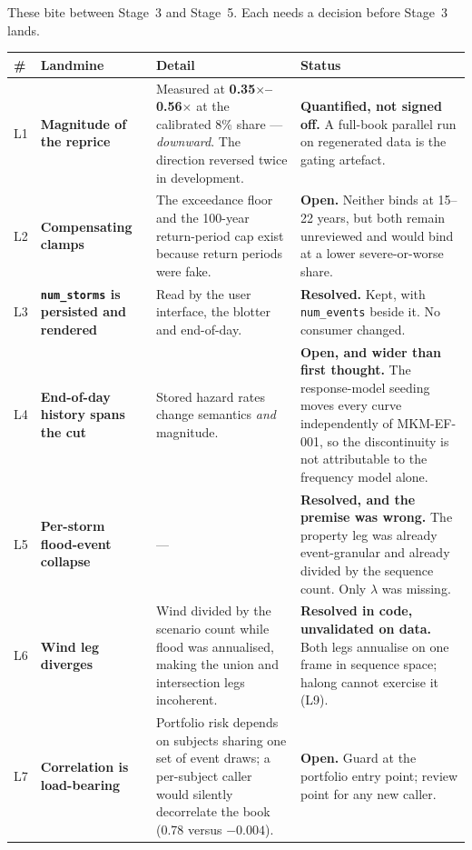 \documentclass[11pt]{article}
\begin{document}
These bite between Stage~3 and Stage~5. Each needs a decision before Stage~3
lands.

\begin{longtable}{@{}p{}p{}p{}p{}@{}}
\toprule
\textbf{\#} & \textbf{Landmine} & \textbf{Detail} & \textbf{Status} \\
\midrule
\endhead
L1 & \textbf{Magnitude of the reprice} & Measured at
\textbf{0.35$\times$--0.56$\times$} at the calibrated 8\% share ---
\emph{downward}. The direction reversed twice in development. & \textbf{Quantified,
not signed off.} A full-book parallel run on regenerated data is the gating
artefact. \\
\addlinespace
L2 & \textbf{Compensating clamps} & The exceedance floor and the 100-year
return-period cap exist because return periods were fake. & \textbf{Open.}
Neither binds at 15--22 years, but both remain unreviewed and would bind at a
lower severe-or-worse share. \\
\addlinespace
L3 & \textbf{\texttt{num\_storms} is persisted and rendered} & Read by the user
interface, the blotter and end-of-day. & \textbf{Resolved.} Kept, with
\texttt{num\_events} beside it. No consumer changed. \\
\addlinespace
L4 & \textbf{End-of-day history spans the cut} & Stored hazard rates change
semantics \emph{and} magnitude. & \textbf{Open, and wider than first thought.}
The response-model seeding moves every curve independently of MKM-EF-001, so the
discontinuity is not attributable to the frequency model alone. \\
\addlinespace
L5 & \textbf{Per-storm flood-event collapse} & --- & \textbf{Resolved, and the
premise was wrong.} The property leg was already event-granular and already
divided by the sequence count. Only $\lambda$ was missing. \\
\addlinespace
L6 & \textbf{Wind leg diverges} & Wind divided by the scenario count while flood
was annualised, making the union and intersection legs incoherent. &
\textbf{Resolved in code, unvalidated on data.} Both legs annualise on one frame
in sequence space; halong cannot exercise it (L9). \\
\addlinespace
L7 & \textbf{Correlation is load-bearing} & Portfolio risk depends on subjects
sharing one set of event draws; a per-subject caller would silently decorrelate
the book (0.78 versus $-0.004$). & \textbf{Open.} Guard at the portfolio entry
point; review point for any new caller. \\

\end{longtable}
\end{document}
